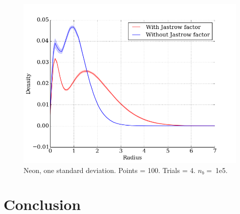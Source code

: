 \documentclass[twocolumns, a4paper,11pt,fleqn]{extarticle}
\begin{document}
\begin{figure}
	\includegraphics[width=\columnwidth]{../res/plot/neon_03/neon_03_pretty.png}
	\caption{Neon, one standard deviation. 
	Points = 100. Trials = 4.	$n_b = \:$1e5.}
	\label{fig:neon_03}
\end{figure}

\section{Conclusion}
\end{document}

